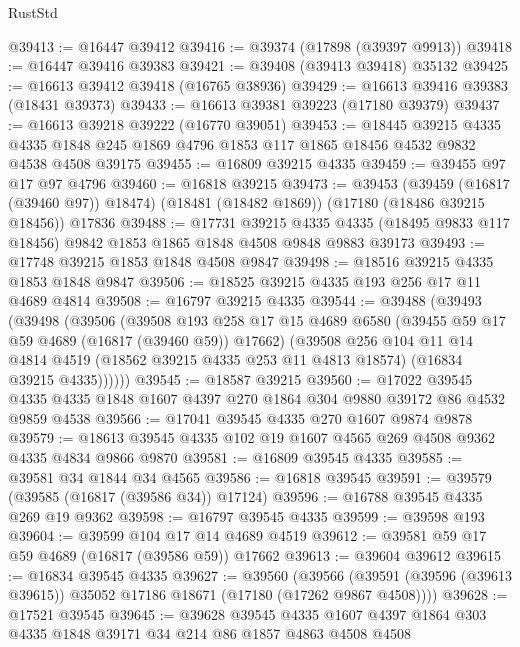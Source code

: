 \begin{lexlean}{RustStd}
\begin{coremodule}
{\begin{coremodule}
{{{{{{{{{{{{{{{{{{{{{{{{{{{{{{{{{{{{{{{{{{{{{{{{{{{{{{{@39413 := @16447 @39412
@39416 := @39374 (@17898 (@39397 @9913))
@39418 := @16447 @39416 @39383
@39421 := @39408 (@39413 @39418) @35132
@39425 := @16613 @39412 @39418 (@16765 @38936)
@39429 := @16613 @39416 @39383 (@18431 @39373)
@39433 := @16613 @39381 @39223 (@17180 @39379)
@39437 := @16613 @39218 @39222 (@16770 @39051)
@39453 := @18445
    @39215
    @4335
    @4335
    @1848
    @245
    @1869
    @4796
    @1853
    @117
    @1865
    @18456
    @4532
    @9832
    @4538
    @4508
    @39175
@39455 := @16809 @39215 @4335
@39459 := @39455 @97 @17 @97 @4796
@39460 := @16818 @39215
@39473 := @39453
    (@39459 (@16817 (@39460 @97)) @18474)
    (@18481 (@18482 @1869))
    (@17180 (@18486 @39215 @18456))
    @17836
@39488 := @17731
    @39215
    @4335
    @4335
    (@18495 @9833 @117 @18456)
    @9842
    @1853
    @1865
    @1848
    @4508
    @9848
    @9883
    @39173
@39493 := @17748 @39215 @1853 @1848 @4508 @9847
@39498 := @18516 @39215 @4335 @1853 @1848 @9847
@39506 := @18525 @39215 @4335 @193 @256 @17 @11 @4689 @4814
@39508 := @16797 @39215 @4335
@39544 := @39488
    (@39493
      (@39498
        (@39506
          (@39508
            @193
            @258
            @17
            @15
            @4689
            @6580
            (@39455 @59 @17 @59 @4689 (@16817 (@39460 @59)) @17662)
            (@39508
              @256
              @104
              @11
              @14
              @4814
              @4519
              (@18562 @39215 @4335 @253 @11 @4813 @18574)
              (@16834 @39215 @4335))))))
@39545 := @18587 @39215
@39560 := @17022
    @39545
    @4335
    @4335
    @1848
    @1607
    @4397
    @270
    @1864
    @304
    @9880
    @39172
    @86
    @4532
    @9859
    @4538
@39566 := @17041 @39545 @4335 @270 @1607 @9874 @9878
@39579 := @18613 @39545 @4335 @102 @19 @1607 @4565 @269 @4508 @9362 @4335 @4834 @9866 @9870
@39581 := @16809 @39545 @4335
@39585 := @39581 @34 @1844 @34 @4565
@39586 := @16818 @39545
@39591 := @39579 (@39585 (@16817 (@39586 @34)) @17124)
@39596 := @16788 @39545 @4335 @269 @19 @9362
@39598 := @16797 @39545 @4335
@39599 := @39598 @193
@39604 := @39599 @104 @17 @14 @4689 @4519
@39612 := @39581 @59 @17 @59 @4689 (@16817 (@39586 @59)) @17662
@39613 := @39604 @39612
@39615 := @16834 @39545 @4335
@39627 := @39560
    (@39566 (@39591 (@39596 (@39613 @39615)) @35052 @17186 @18671 (@17180 (@17262 @9867 @4508))))
@39628 := @17521 @39545
@39645 := @39628
    @39545
    @4335
    @1607
    @4397
    @1864
    @303
    @4335
    @1848
    @39171
    @34
    @214
    @86
    @1857
    @4863
    @4508
    @4508
}}}}}}}}}}}}}}}}}}}}}}}}}}}}}}}}}}}}}}}}}}}}}}}}}}}}}}}
\end{coremodule}}
\end{coremodule}
\end{lexlean}
